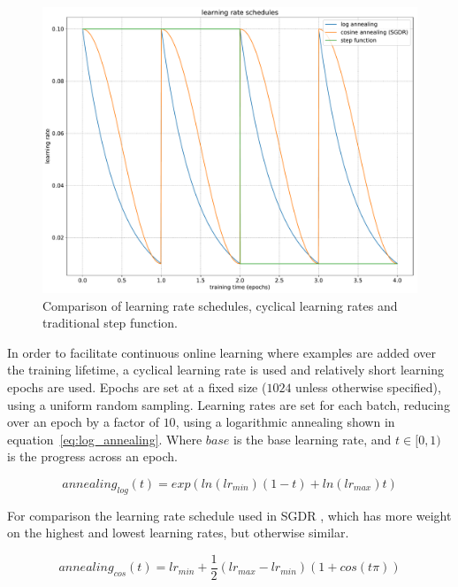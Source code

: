 \begin{figure}[h]
  \centering
  \includegraphics[width=1.0\linewidth]{charts/training/lr_schedules.pdf}
  \caption{Comparison of learning rate schedules, cyclical learning rates and traditional step function.  }  
  \label{fig:lr_schedule}
\end{figure}

In order to facilitate continuous online learning where examples are added over the training lifetime, a cyclical learning rate is used and relatively short learning epochs are used. Epochs are set at a fixed size ($1024$ unless otherwise specified), using a uniform random sampling. Learning rates are set for each batch, reducing over an epoch by a factor of $10$, using a logarithmic annealing shown in equation~\ref{eq:log_annealing}. Where $base$ is the base learning rate, and $ t \in [0, 1) $ is the progress across an epoch.

\begin{equation}
annealing_{log}(t) = exp(ln (lr_{min}) (1 - t) + ln(lr_{max})  t)
\label{eq:log_annealing}
\end{equation}

For comparison the learning rate schedule used in \gls{SGDR} \cite{Loshchilov2016}, which has more weight on the highest and lowest learning rates, but otherwise similar.

\begin{equation}
annealing_{cos}(t) = lr_{min} +  \frac{1}{2} (lr_{max} - lr_{min}) (1 + cos (t \pi))
\label{eq:cosine_annealing}
\end{equation}

